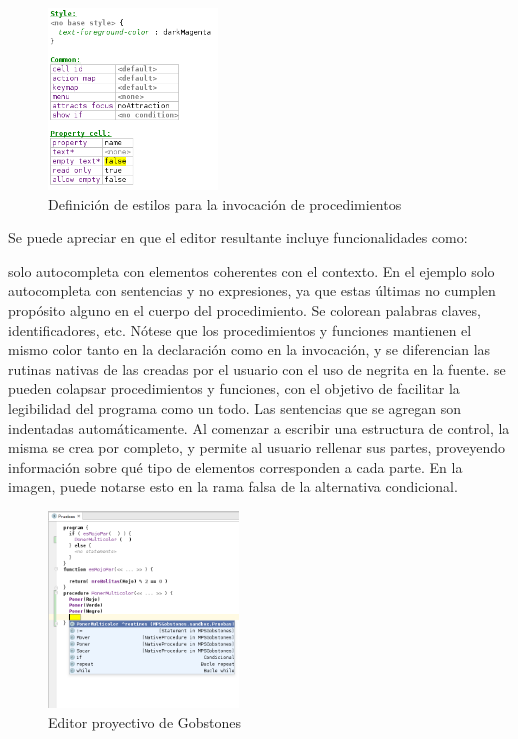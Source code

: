   \begin{figure}
  \centering
  \includegraphics[width=0.40\textwidth]{assets/editor-style}
  \caption{Definición de estilos para la invocación de procedimientos}
  \label{fig:editor-style}
  \end{figure}


Se puede apreciar en  que el editor resultante incluye funcionalidades como:
\begin{itemize}
 solo autocompleta con elementos coherentes con el contexto. En el ejemplo solo autocompleta con sentencias y no expresiones, ya que estas últimas no cumplen propósito alguno en el cuerpo del procedimiento.
 Se colorean palabras claves, identificadores, etc. Nótese que los procedimientos y funciones mantienen el mismo color tanto en la declaración como en la invocación, y se diferencian las rutinas nativas de las creadas por el usuario con el uso de negrita en la fuente.
 se pueden colapsar procedimientos y funciones, con el objetivo de facilitar la legibilidad del programa como un todo.
 Las sentencias que se agregan son indentadas automáticamente.
 Al comenzar a escribir una estructura de control, la misma se crea por completo, y permite al usuario rellenar sus partes, proveyendo información sobre qué tipo de elementos corresponden a cada parte. En la imagen, puede notarse esto en la rama falsa de la alternativa condicional.
\end{itemize}

  \begin{figure}
  \centering
  \includegraphics[width=0.45\textwidth]{assets/sandbox-editor}
  \caption{Editor proyectivo de Gobstones}
  \label{fig:sandbox-editor}
  \end{figure}

